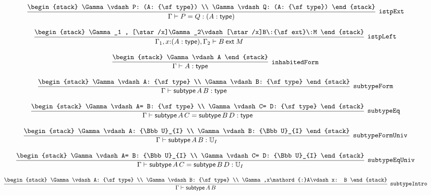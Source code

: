 \[
\infer[{\tt istpExt}]{\Gamma \vdash P= Q: (A: {\sf type})}{
\begin{stack}
\Gamma \vdash P: (A: {\sf type})
\\
\Gamma \vdash Q: (A: {\sf type})
\end{stack}}
\]

\[
\infer[{\tt istpLeft}]{\Gamma_1 ,x\mathord{:}(A: {\sf type}), \Gamma_2 \vdash B\:{\sf ext}\:M}{
\begin{stack}
\Gamma_1 , [\star /x]\Gamma_2\vdash [\star /x]B\:{\sf ext}\:M
\end{stack}}
\]

\[
\infer[{\tt inhabitedForm}]{\Gamma \vdash A: {\sf type}}{
\begin{stack}
\Gamma \vdash A
\end{stack}}
\]

\[
\infer[{\tt subtypeForm}]{\Gamma \vdash {\sf subtype}\,A\,B: {\sf type}}{
\begin{stack}
\Gamma \vdash A: {\sf type}
\\
\Gamma \vdash B: {\sf type}
\end{stack}}
\]

\[
\infer[{\tt subtypeEq}]{\Gamma \vdash {\sf subtype}\,A\,C= {\sf subtype}\,B\,D: {\sf type}}{
\begin{stack}
\Gamma \vdash A= B: {\sf type}
\\
\Gamma \vdash C= D: {\sf type}
\end{stack}}
\]

\[
\infer[{\tt subtypeFormUniv}]{\Gamma \vdash {\sf subtype}\,A\,B: {\Bbb U}_{I}}{
\begin{stack}
\Gamma \vdash A: {\Bbb U}_{I}
\\
\Gamma \vdash B: {\Bbb U}_{I}
\end{stack}}
\]

\[
\infer[{\tt subtypeEqUniv}]{\Gamma \vdash {\sf subtype}\,A\,C= {\sf subtype}\,B\,D: {\Bbb U}_{I}}{
\begin{stack}
\Gamma \vdash A= B: {\Bbb U}_{I}
\\
\Gamma \vdash C= D: {\Bbb U}_{I}
\end{stack}}
\]

\[
\infer[{\tt subtypeIntro}]{\Gamma \vdash {\sf subtype}\,A\,B}{
\begin{stack}
\Gamma \vdash A: {\sf type}
\\
\Gamma \vdash B: {\sf type}
\\
\Gamma ,x\mathord{:}A\vdash x: B
\end{stack}}
\]

